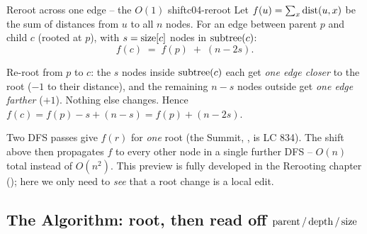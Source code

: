 \begin{proposition}{Reroot across one edge -- the $O(1)$ shift}{c04-reroot}
Let $f(u)=\sum_{x} \operatorname{dist}(u,x)$ be the sum of distances from $u$ to all $n$ nodes. For an
edge between parent $p$ and child $c$ (rooted at $p$), with $s=\operatorname{size}[c]$ nodes in
$\operatorname{subtree}(c)$:
\[
   f(c) \;=\; f(p) \;+\; (n - 2s).
\]
\end{proposition}
\begin{proofbox}
Re-root from $p$ to $c$: the $s$ nodes inside $\operatorname{subtree}(c)$ each get \emph{one edge
closer} to the root ($-1$ to their distance), and the remaining $n-s$ nodes outside get
\emph{one edge farther} ($+1$). Nothing else changes. Hence
$f(c) = f(p) - s + (n-s) = f(p) + (n - 2s)$.
\end{proofbox}
\begin{notebox}
Two DFS passes give $f(r)$ for \emph{one} root (the Summit, , is LC 834).
The shift above then propagates $f$ to every other node in a single further DFS -- $O(n)$
total instead of $O(n^2)$. This preview is fully developed in the Rerooting chapter
(); here we only need to \emph{see} that a root change is a local edit.
\end{notebox}

\subsection{The Algorithm: root, then read off \texorpdfstring{$\operatorname{parent}/\operatorname{depth}/\operatorname{size}$}{parent/depth/size}}

